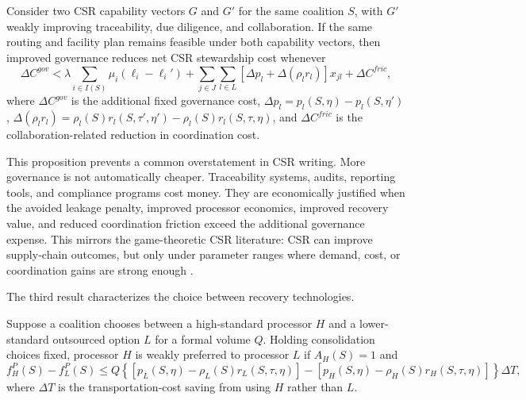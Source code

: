 \begin{proposition}
\label{prop:ch4_governance_value}
Consider two CSR capability vectors $G$ and $G'$ for the same coalition $S$, with $G'$ weakly improving traceability, due diligence, and collaboration. If the same routing and facility plan remains feasible under both capability vectors, then improved governance reduces net CSR stewardship cost whenever
\begin{equation}
\label{eq:ch4_governance_value_condition}
\Delta C^{gov}
<
\lambda\sum_{i\in I(S)}\mu_i(\ell_i-\ell_i')
+\sum_{j\in J}\sum_{l\in L}
\left[
\Delta p_l+\Delta\left(\rho_l r_l\right)
\right]x_{jl}
+\Delta C^{fric},
\end{equation}
where $\Delta C^{gov}$ is the additional fixed governance cost, $\Delta p_l=p_l(S,\eta)-p_l(S,\eta')$, $\Delta(\rho_l r_l)=\rho_l(S)r_l(S,\tau',\eta')-\rho_l(S)r_l(S,\tau,\eta)$, and $\Delta C^{fric}$ is the collaboration-related reduction in coordination cost.
\end{proposition}

This proposition prevents a common overstatement in CSR writing. More governance is not automatically cheaper. Traceability systems, audits, reporting tools, and compliance programs cost money. They are economically justified when the avoided leakage penalty, improved processor economics, improved recovery value, and reduced coordination friction exceed the additional governance expense. This mirrors the game-theoretic CSR literature: CSR can improve supply-chain outcomes, but only under parameter ranges where demand, cost, or coordination gains are strong enough \cite{FantiBuccella2017,Ferrara2017,Khosroshahi2019,ZhangLiang2023}.

The third result characterizes the choice between recovery technologies.

\begin{proposition}
\label{prop:ch4_processor_threshold}
Suppose a coalition chooses between a high-standard processor $H$ and a lower-standard outsourced option $L$ for a formal volume $Q$. Holding consolidation choices fixed, processor $H$ is weakly preferred to processor $L$ if $A_H(S)=1$ and
\begin{equation}
\label{eq:ch4_processor_threshold}
f_H^P(S)-f_L^P(S)
\leq
Q\left\{
\left[p_L(S,\eta)-\rho_L(S)r_L(S,\tau,\eta)\right]
-
\left[p_H(S,\eta)-\rho_H(S)r_H(S,\tau,\eta)\right]
\right\}
\Delta T,
\end{equation}
where $\Delta T$ is the transportation-cost saving from using $H$ rather than $L$.
\end{proposition}

